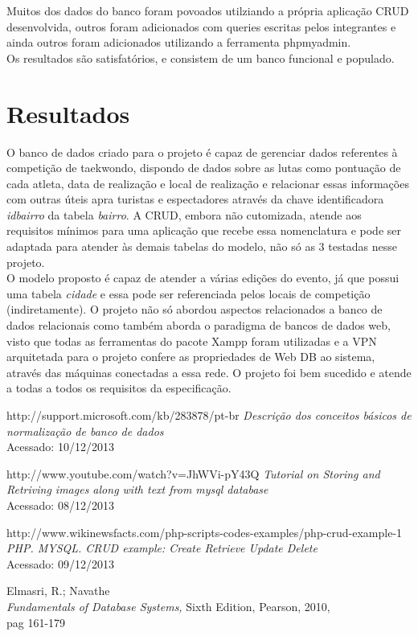 \documentclass[10pt]{article}
\begin{document}
\begin{multicols}{2}


Muitos dos dados do banco foram povoados utilziando a própria aplicação CRUD desenvolvida, outros foram adicionados com queries escritas pelos integrantes e ainda outros foram adicionados utilizando a ferramenta phpmyadmin.
\\Os resultados são satisfatórios, e consistem de um banco funcional e populado. 

\section{Resultados}
O banco de dados criado para o projeto é capaz de gerenciar dados referentes à competição de taekwondo, dispondo de dados sobre as lutas como pontuação de cada atleta, data de realização e local de realização e relacionar essas informações com outras úteis apra turistas e espectadores através da chave identificadora \emph{idbairro} da tabela \emph{bairro}. A CRUD, embora não cutomizada, atende aos requisitos mínimos para uma aplicação que recebe essa nomenclatura e pode ser adaptada para atender às demais tabelas do modelo, não só as 3 testadas nesse projeto. \\ O modelo proposto é capaz de atender a várias edições do evento, já que possui uma tabela \emph{cidade} e essa pode ser referenciada pelos locais de competição (indiretamente). O projeto não só abordou aspectos relacionados a banco de dados relacionais como também aborda o paradigma de bancos de dados web, visto que todas as ferramentas do pacote Xampp foram utilizadas e a VPN arquitetada para o projeto confere as propriedades de Web DB ao sistema, através das máquinas conectadas a essa rede. O projeto foi bem sucedido e atende a todas a todos os requisitos da especificação.

\begin{thebibliography}{9}

  http://support.microsoft.com/kb/283878/pt-br
  \emph{Descrição dos conceitos básicos de normalização de banco de dados}\\
Acessado: 10/12/2013

http://www.youtube.com/watch?v=JhWVi-pY43Q
  \emph{Tutorial on Storing and Retriving images along with text from mysql database}\\
Acessado: 08/12/2013

http://www.wikinewsfacts.com/php-scripts-codes-examples/php-crud-example-1
  \emph{PHP. MYSQL. CRUD example: Create Retrieve Update Delete}\\
Acessado: 09/12/2013

Elmasri, R.; Navathe \\
\emph{Fundamentals of Database Systems,}
 Sixth Edition, Pearson, 2010, \\
pag 161-179




\end{thebibliography}

\end{multicols}
\end{document}
